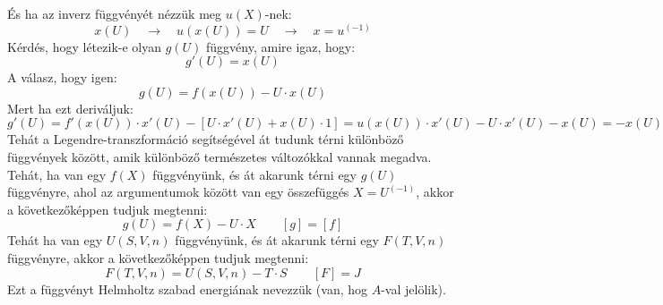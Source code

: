 \documentclass[a4paper,12pt]{article}
\begin{document}
És ha az inverz függvényét nézzük meg $u(X)$-nek:
\begin{equation}
    x(U) \quad \rightarrow \quad u(x(U)) = U \quad \rightarrow \quad x = u^{(-1)}
\end{equation}
Kérdés, hogy létezik-e olyan $g(U)$ függvény, amire igaz, hogy:
\begin{equation}
    g'(U) = x(U)
\end{equation}
A válasz, hogy igen:
\begin{equation}
    g(U) = f(x(U)) - U \cdot x(U)
\end{equation}
Mert ha ezt deriváljuk:
\begin{equation}
    g'(U) = f'(x(U)) \cdot x'(U) - \left[ U \cdot x'(U) + x(U) \cdot 1 \right] = u(x(U)) \cdot x'(U) - U \cdot x'(U) - x(U) = - x(U)
\end{equation}
Tehát a Legendre-transzformáció segítségével át tudunk térni különböző függvények között, amik különböző természetes változókkal vannak megadva.
Tehát, ha van egy $f(X)$ függvényünk, és át akarunk térni egy $g(U)$ függvényre, ahol az argumentumok között van egy összefüggés $X = U^{(-1)}$, akkor a következőképpen tudjuk megtenni:
\begin{equation}
    g(U) = f(X) - U \cdot X \qquad \left[g\right] = \left[f\right]
\end{equation}
Tehát ha van egy $U(S,V,n)$ függvényünk, és át akarunk térni egy $F(T,V,n)$ függvényre, akkor a következőképpen tudjuk megtenni:
\begin{equation}
    F(T,V,n) = U(S,V,n) - T \cdot S \qquad \left[F\right] = J
\end{equation}
Ezt a függvényt Helmholtz szabad energiának nevezzük (van, hog $A$-val jelölik).
\end{document}
